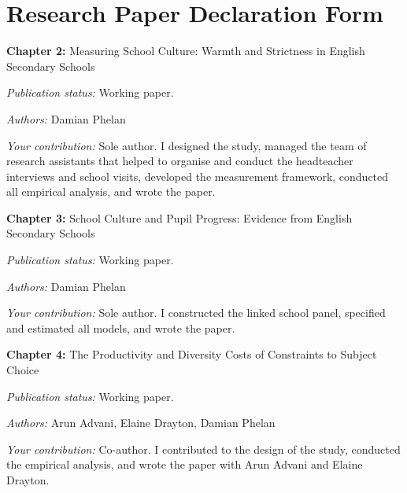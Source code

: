 \chapter*{Research Paper Declaration Form}

%

\noindent\textbf{Chapter 2:} Measuring School Culture: Warmth and Strictness in
English Secondary Schools

\noindent\textit{Publication status:} Working paper.

\noindent\textit{Authors:} Damian Phelan

\noindent\textit{Your contribution:} Sole author. I designed the study, 
managed the team of research assistants that helped to organise and 
conduct the headteacher interviews and school visits, developed the measurement framework,
conducted all empirical analysis, and wrote the paper.

\bigskip
\noindent\textbf{Chapter 3:} School Culture and Pupil Progress: Evidence from
English Secondary Schools

\noindent\textit{Publication status:} Working paper.

\noindent\textit{Authors:} Damian Phelan

\noindent\textit{Your contribution:} Sole author. I constructed the linked
school panel, specified and estimated all models, and wrote the paper.

\bigskip
\noindent\textbf{Chapter 4:} The Productivity and Diversity Costs of
Constraints to Subject Choice

\noindent\textit{Publication status:} Working paper.

\noindent\textit{Authors:} Arun Advani, Elaine Drayton, Damian Phelan

\noindent\textit{Your contribution:} Co-author. I contributed to the 
design of the study, conducted the empirical analysis, and wrote the 
paper with Arun Advani and Elaine Drayton.
